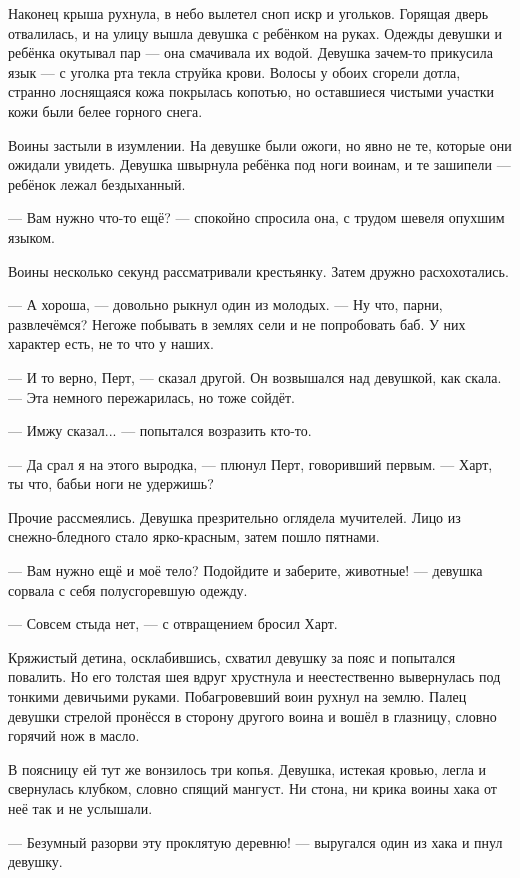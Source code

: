 Наконец крыша рухнула, в небо вылетел сноп искр и угольков.
Горящая дверь отвалилась, и на улицу вышла девушка с ребёнком на руках.
Одежды девушки и ребёнка окутывал пар --- она смачивала их водой.
Девушка зачем-то прикусила язык --- с уголка рта текла струйка крови.
Волосы у обоих сгорели дотла, странно лоснящаяся кожа покрылась копотью, но оставшиеся чистыми участки кожи были белее горного снега.

Воины застыли в изумлении.
На девушке были ожоги, но явно не те, которые они ожидали увидеть.
Девушка швырнула ребёнка под ноги воинам, и те зашипели --- ребёнок лежал бездыханный.

--- Вам нужно что-то ещё? --- спокойно спросила она, с трудом шевеля опухшим языком.

Воины несколько секунд рассматривали крестьянку.
Затем дружно расхохотались.

--- А хороша, --- довольно рыкнул один из молодых.
--- Ну что, парни, развлечёмся?
Негоже побывать в землях сели и не попробовать баб.
У них характер есть, не то что у наших.

--- И то верно, Перт, --- сказал другой.
Он возвышался над девушкой, как скала.
--- Эта немного пережарилась, но тоже сойдёт.

--- Имжу сказал... --- попытался возразить кто-то.

--- Да срал я на этого выродка, --- плюнул Перт, говоривший первым.
--- Харт, ты что, бабьи ноги не удержишь?

Прочие рассмеялись.
Девушка презрительно оглядела мучителей.
Лицо из снежно-бледного стало ярко-красным, затем пошло пятнами.

--- Вам нужно ещё и моё тело?
Подойдите и заберите, животные! --- девушка сорвала с себя полусгоревшую одежду.

--- Совсем стыда нет, --- с отвращением бросил Харт.

Кряжистый детина, осклабившись, схватил девушку за пояс и попытался повалить.
Но его толстая шея вдруг хрустнула и неестественно вывернулась под тонкими девичьими руками.
Побагровевший воин рухнул на землю.
Палец девушки стрелой пронёсся в сторону другого воина и вошёл в глазницу, словно горячий нож в масло.

В поясницу ей тут же вонзилось три копья.
Девушка, истекая кровью, легла и свернулась клубком, словно спящий мангуст.
Ни стона, ни крика воины хака от неё так и не услышали.

--- Безумный разорви эту проклятую деревню! --- выругался один из хака и пнул девушку.

